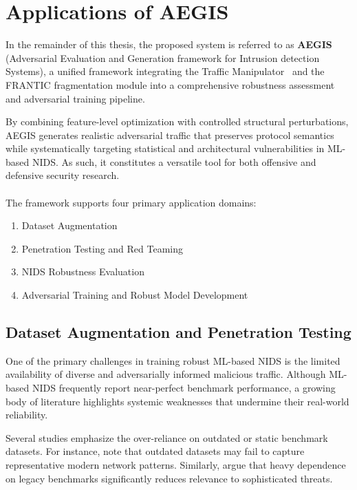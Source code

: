 \chapter{Applications of AEGIS}
\label{cha:applications}

In the remainder of this thesis, the proposed system is referred to as \textbf{AEGIS} (Adversarial Evaluation and Generation framework for Intrusion detection Systems), a unified framework integrating the Traffic Manipulator~\cite{han2021evaluating} and the FRANTIC fragmentation module into a comprehensive robustness assessment and adversarial training pipeline.

By combining feature-level optimization with controlled structural perturbations, AEGIS generates realistic adversarial traffic that preserves protocol semantics while systematically targeting statistical and architectural vulnerabilities in ML-based NIDS. As such, it constitutes a versatile tool for both offensive and defensive security research.
\\\\
The framework supports four primary application domains:
\begin{enumerate}
    \item Dataset Augmentation
    \item Penetration Testing and Red Teaming
    \item NIDS Robustness Evaluation
    \item Adversarial Training and Robust Model Development
\end{enumerate}

\section{Dataset Augmentation and Penetration Testing}

One of the primary challenges in training robust ML-based NIDS is the limited availability of diverse and adversarially informed malicious traffic. Although ML-based NIDS frequently report near-perfect benchmark performance, a growing body of literature highlights systemic weaknesses that undermine their real-world reliability.

Several studies emphasize the over-reliance on outdated or static benchmark datasets. For instance, \cite{he2023adversarial} note that outdated datasets may fail to capture representative modern network patterns. Similarly, \cite{ahmed2025network} argue that heavy dependence on legacy benchmarks significantly reduces relevance to sophisticated threats.

